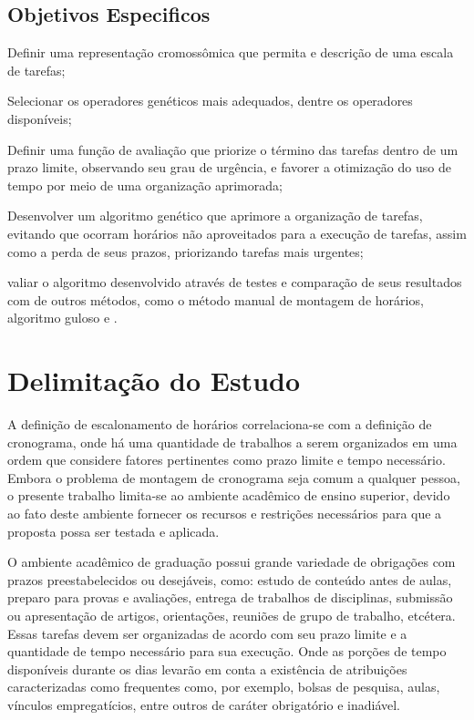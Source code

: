 \subsection[Objetivos Especificos]{Objetivos Especificos}
\begin{alineas}
	\item Definir uma representação cromossômica que permita e descrição de uma escala de tarefas;
    \item Selecionar os operadores genéticos mais adequados, dentre os operadores disponíveis;
    \item Definir uma função de avaliação que priorize o término das tarefas dentro de um prazo limite, observando seu grau de urgência, e favorer a otimização do uso de tempo por meio de uma organização aprimorada;
    \item Desenvolver um algoritmo genético que aprimore a organização de tarefas, evitando que ocorram horários não aproveitados para a execução de tarefas, assim como a perda de seus prazos, priorizando tarefas mais urgentes;
    \item valiar o algoritmo desenvolvido através de testes e comparação de seus resultados com de outros métodos, como o método manual de montagem de horários, algoritmo guloso e .
\end{alineas}


\section[Delimitação do Estudo]{Delimitação do Estudo}
\par A definição de escalonamento de horários correlaciona-se com a definição de cronograma, onde há uma quantidade de trabalhos a serem organizados em uma ordem que considere fatores pertinentes como prazo limite e tempo necessário. Embora o problema de montagem de cronograma seja comum a qualquer pessoa, o presente trabalho limita-se ao ambiente acadêmico de ensino superior, devido ao fato deste ambiente fornecer os recursos e restrições necessários para que a proposta possa ser testada e aplicada.
\par O ambiente acadêmico de graduação possui grande variedade de obrigações com prazos preestabelecidos ou desejáveis, como: estudo de conteúdo antes de aulas, preparo para provas e avaliações, entrega de trabalhos de disciplinas, submissão ou apresentação de artigos, orientações, reuniões de grupo de trabalho, etcétera. Essas tarefas devem ser organizadas de acordo com seu prazo limite e a quantidade de tempo necessário para sua execução. Onde as porções de tempo disponíveis durante os dias levarão em conta a existência de atribuições caracterizadas como frequentes como, por exemplo, bolsas de pesquisa, aulas, vínculos empregatícios, entre outros de caráter obrigatório e inadiável.

